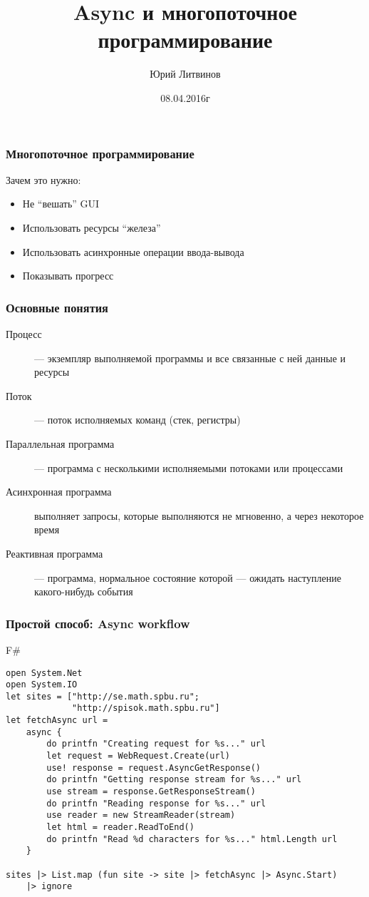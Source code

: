 \documentclass[xetex,mathserif,serif]{beamer}
\title{Async и многопоточное программирование}
\author{Юрий Литвинов}
\date{08.04.2016г}
\begin{document}
	
	\frame{\titlepage}
	
    \begin{frame}
        \frametitle{Многопоточное программирование}
        Зачем это нужно:
        \begin{itemize}
            \item Не ``вешать'' GUI
            \item Использовать ресурсы ``железа''
            \item Использовать асинхронные операции ввода-вывода
            \item Показывать прогресс
        \end{itemize}
    \end{frame}
    
    \begin{frame}
        \frametitle{Основные понятия}
        \begin{description}
            \item[Процесс] --- экземпляр выполняемой программы и все связанные с ней данные и ресурсы
            \item[Поток] --- поток исполняемых команд (стек, регистры)
            \item[Параллельная программа] --- программа с несколькими исполняемыми потоками или процессами
            \item[Асинхронная программа] выполняет запросы, которые выполняются не мгновенно, а через некоторое время
            \item[Реактивная программа] --- программа, нормальное состояние которой --- ожидать наступление какого-нибудь события
        \end{description}
    \end{frame}
    
    \begin{frame}[fragile]
        \frametitle{Простой способ: Async workflow}
   		\begin{exampleblock}{F\#}
   			\begin{lstlisting}[basicstyle=\scriptsize]
open System.Net
open System.IO
let sites = ["http://se.math.spbu.ru";
             "http://spisok.math.spbu.ru"]
let fetchAsync url =
    async { 
        do printfn "Creating request for %s..." url
        let request = WebRequest.Create(url)
        use! response = request.AsyncGetResponse()
        do printfn "Getting response stream for %s..." url
        use stream = response.GetResponseStream()
        do printfn "Reading response for %s..." url
        use reader = new StreamReader(stream)
        let html = reader.ReadToEnd()
        do printfn "Read %d characters for %s..." html.Length url 
    }

sites |> List.map (fun site -> site |> fetchAsync |> Async.Start) 
    |> ignore
\end{lstlisting}
\end{exampleblock}
\end{frame}
\end{document}
